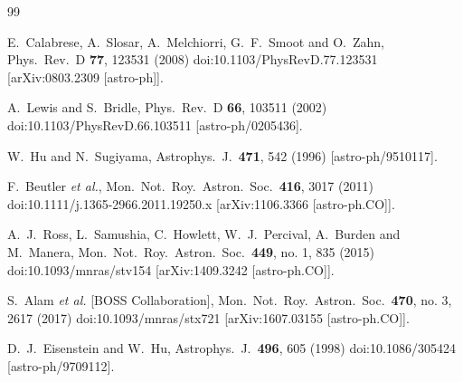 \documentclass[floatfix,aps,amsmath,nofootinbib,onecolumn,10pt]{revtex4}
\begin{document}
\begin{thebibliography}{99}
  






  E.~Calabrese, A.~Slosar, A.~Melchiorri, G.~F.~Smoot and O.~Zahn,
  Phys.\ Rev.\ D {\bf 77}, 123531 (2008)
  doi:10.1103/PhysRevD.77.123531
  [arXiv:0803.2309 [astro-ph]].
 
 
  A.~Lewis and S.~Bridle,
  Phys.\ Rev.\ D {\bf 66}, 103511 (2002)
  doi:10.1103/PhysRevD.66.103511
  [astro-ph/0205436].

  W.~Hu and N.~Sugiyama,
  Astrophys.\ J.\  {\bf 471}, 542 (1996)
  [astro-ph/9510117].
  
  F.~Beutler {\it et al.},
  Mon.\ Not.\ Roy.\ Astron.\ Soc.\  {\bf 416}, 3017 (2011)
  doi:10.1111/j.1365-2966.2011.19250.x
  [arXiv:1106.3366 [astro-ph.CO]].



  A.~J.~Ross, L.~Samushia, C.~Howlett, W.~J.~Percival, A.~Burden and M.~Manera,
  Mon.\ Not.\ Roy.\ Astron.\ Soc.\  {\bf 449}, no. 1, 835 (2015)
  doi:10.1093/mnras/stv154
  [arXiv:1409.3242 [astro-ph.CO]].

  S.~Alam {\it et al.} [BOSS Collaboration],
  Mon.\ Not.\ Roy.\ Astron.\ Soc.\  {\bf 470}, no. 3, 2617 (2017)
  doi:10.1093/mnras/stx721
  [arXiv:1607.03155 [astro-ph.CO]].

  D.~J.~Eisenstein and W.~Hu,
  Astrophys.\ J.\  {\bf 496}, 605 (1998)
  doi:10.1086/305424
  [astro-ph/9709112].


\end{thebibliography}


 
\end{document}
